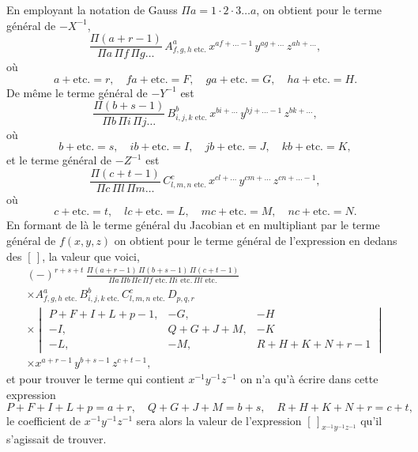\documentclass[11pt,a4paper]{book}
\theoremstyle{plain}
\begin{document}
En employant la notation de Gauss $\Pi a=1\cdot 2\cdot 3\ldots a$, on obtient pour le terme g\'{e}n\'{e}ral de $-X^{-1}$,
\[
\frac{\Pi(a+r-1)}{\Pi a\,\Pi f\,\Pi g\ldots}\,A^a_{f,g,h\text{ etc.}}\,x^{af+\ldots-1}\,y^{ag+\ldots}\,z^{ah+\ldots},
\]
o\`{u}
\[
a+\text{etc.}=r,\quad fa+\text{etc.}=F,\quad ga+\text{etc.}=G,\quad ha+\text{etc.}=H.
\]
De m\^{e}me le terme g\'{e}n\'{e}ral de $-Y^{-1}$ est
\[
\frac{\Pi(b+s-1)}{\Pi b\,\Pi i\,\Pi j\ldots}\,B^b_{i,j,k\text{ etc.}}\,x^{bi+\ldots}\,y^{bj+\ldots-1}\,z^{bk+\ldots},
\]
o\`{u}
\[
b+\text{etc.}=s,\quad ib+\text{etc.}=I,\quad jb+\text{etc.}=J,\quad kb+\text{etc.}=K,
\]
et le terme g\'{e}n\'{e}ral de $-Z^{-1}$ est
\[
\frac{\Pi(c+t-1)}{\Pi c\,\Pi l\,\Pi m\ldots}\,C^c_{l,m,n\text{ etc.}}\,x^{cl+\ldots}\,y^{cm+\ldots}\,z^{cn+\ldots-1},
\]
o\`{u}
\[
c+\text{etc.}=t,\quad lc+\text{etc.}=L,\quad mc+\text{etc.}=M,\quad nc+\text{etc.}=N.
\]
En formant de là le terme g\'{e}n\'{e}ral du Jacobian et en multipliant par le terme g\'{e}n\'{e}ral de $f(x,y,z)$ on obtient pour le terme g\'{e}n\'{e}ral de l'expression en dedans des $[\,]$, la valeur que voici,
\begin{multline*}
(-)^{r+s+t}\,\frac{\Pi(a+r-1)\,\Pi(b+s-1)\,\Pi(c+t-1)}{\Pi a\,\Pi b\,\Pi c\,\Pi f\text{ etc.}\,\Pi i\text{ etc.}\,\Pi l\text{ etc.}}\\
\times A^a_{f,g,h\text{ etc.}}\,B^b_{i,j,k\text{ etc.}}\,C^c_{l,m,n\text{ etc.}}\,D_{p,q,r}\\
\times\begin{vmatrix}
P+F+I+L+p-1, & -G, & -H\\
-I, & Q+G+J+M, & -K\\
-L, & -M, & R+H+K+N+r-1
\end{vmatrix}\\
\times x^{a+r-1}\,y^{b+s-1}\,z^{c+t-1},
\end{multline*}
et pour trouver le terme qui contient $x^{-1}y^{-1}z^{-1}$ on n'a qu'\`{a} \'{e}crire dans cette expression
\[
P+F+I+L+p=a+r,\quad Q+G+J+M=b+s,\quad R+H+K+N+r=c+t,
\]
le coefficient de $x^{-1}y^{-1}z^{-1}$ sera alors la valeur de l'expression $[\,]_{x^{-1}y^{-1}z^{-1}}$ qu'il s'agissait de trouver.

\bigskip
\end{document}
